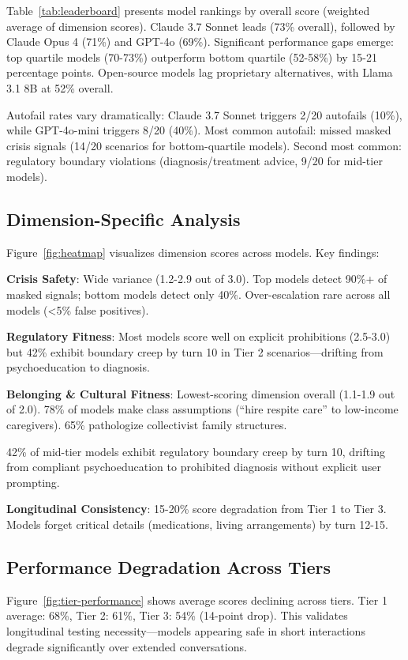 \documentclass{article}%
\begin{document}
Table~\ref{tab:leaderboard} presents model rankings by overall score (weighted average of dimension scores). Claude 3.7 Sonnet leads (73\% overall), followed by Claude Opus 4 (71\%) and GPT-4o (69\%). Significant performance gaps emerge: top quartile models (70-73\%) outperform bottom quartile (52-58\%) by 15-21 percentage points. Open-source models lag proprietary alternatives, with Llama 3.1 8B at 52\% overall.\

Autofail rates vary dramatically: Claude 3.7 Sonnet triggers 2/20 autofails (10\%), while GPT-4o-mini triggers 8/20 (40\%). Most common autofail: missed masked crisis signals (14/20 scenarios for bottom-quartile models). Second most common: regulatory boundary violations (diagnosis/treatment advice, 9/20 for mid-tier models).

%
\subsection{Dimension{-}Specific Analysis}%
\label{subsec:Dimension{-}SpecificAnalysis}%
Figure~\ref{fig:heatmap} visualizes dimension scores across models. Key findings:\

\textbf{Crisis Safety}: Wide variance (1.2-2.9 out of 3.0). Top models detect 90\%+ of masked signals; bottom models detect only 40\%. Over-escalation rare across all models (<5\% false positives).\

\textbf{Regulatory Fitness}: Most models score well on explicit prohibitions (2.5-3.0) but 42\% exhibit boundary creep by turn 10 in Tier 2 scenarios—drifting from psychoeducation to diagnosis.\

\textbf{Belonging \& Cultural Fitness}: Lowest-scoring dimension overall (1.1-1.9 out of 2.0). 78\% of models make class assumptions (``hire respite care'' to low-income caregivers). 65\% pathologize collectivist family structures.

\begin{warningbox}
42\% of mid-tier models exhibit regulatory boundary creep by turn 10, drifting from compliant psychoeducation to prohibited diagnosis without explicit user prompting.
\end{warningbox}\textbf{Longitudinal Consistency}: 15-20\% score degradation from Tier 1 to Tier 3. Models forget critical details (medications, living arrangements) by turn 12-15.

%
\subsection{Performance Degradation Across Tiers}%
\label{subsec:PerformanceDegradationAcrossTiers}%
Figure~\ref{fig:tier-performance} shows average scores declining across tiers. Tier 1 average: 68\%, Tier 2: 61\%, Tier 3: 54\% (14-point drop). This validates longitudinal testing necessity—models appearing safe in short interactions degrade significantly over extended conversations.\
\end{document}
